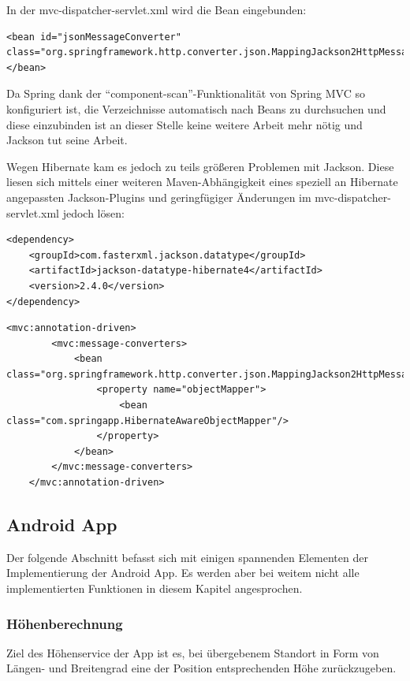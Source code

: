 In der mvc-dispatcher-servlet.xml wird die Bean eingebunden:
\lstset{language=xml}
\begin{lstlisting}[frame=htrbl, caption={Ausschnitt aus mvc-dispatcher-servlet.xml}, breaklines=true]
<bean id="jsonMessageConverter" class="org.springframework.http.converter.json.MappingJackson2HttpMessageConverter">
</bean>
\end{lstlisting}

Da Spring dank der ``component-scan''-Funktionalität von Spring MVC so konfiguriert ist, die Verzeichnisse automatisch nach Beans zu durchsuchen und diese einzubinden ist an dieser Stelle keine weitere Arbeit mehr nötig und Jackson tut seine Arbeit.

Wegen Hibernate kam es jedoch zu teils größeren Problemen mit Jackson. Diese liesen sich mittels einer weiteren Maven-Abhängigkeit eines speziell an Hibernate angepassten Jackson-Plugins und geringfügiger Änderungen im mvc-dispatcher-servlet.xml jedoch lösen:
\lstset{language=xml}
\begin{lstlisting}[frame=htrbl, caption={Ausschnitt aus der pom.xml}, breaklines=true]
<dependency>
	<groupId>com.fasterxml.jackson.datatype</groupId>
	<artifactId>jackson-datatype-hibernate4</artifactId>
	<version>2.4.0</version>
</dependency>
\end{lstlisting}
\lstset{language=xml}
\begin{lstlisting}[frame=htrbl, caption={Ausschnitt aus mvc-dispatcher-servlet.xml}, breaklines=true]
<mvc:annotation-driven>
        <mvc:message-converters>
            <bean class="org.springframework.http.converter.json.MappingJackson2HttpMessageConverter">
                <property name="objectMapper">
                    <bean class="com.springapp.HibernateAwareObjectMapper"/>
                </property>
            </bean>
        </mvc:message-converters>
    </mvc:annotation-driven>
\end{lstlisting}
\subsection{Android App}
Der folgende Abschnitt befasst sich mit einigen spannenden Elementen der Implementierung der Android App. Es werden aber bei weitem nicht alle implementierten Funktionen in diesem Kapitel angesprochen.
\subsubsection{Höhenberechnung}
Ziel des Höhenservice der App ist es, bei übergebenem Standort in Form von Längen- und Breitengrad eine der Position entsprechenden Höhe zurückzugeben.

